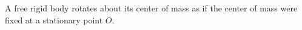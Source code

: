 A free rigid body rotates about its center of mass as if the center of mass were fixed at a stationary point $O$.
